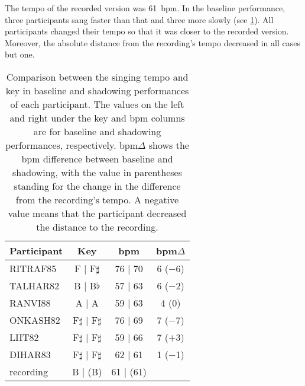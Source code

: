 The tempo of the recorded version was \SI{61}{\ac{bpm}}.
In the baseline performance, three participants sang faster than that and three more slowly (see \cref{tab:bpm_and_keys}).
All participants changed their tempo so that it was closer to the recorded version.
Moreover, the absolute distance from the recording's tempo decreased in all cases but one.


\begin{table}
	\caption[Key and \acs{bpm} deviation summary]
			{Comparison between the singing tempo and key in baseline and shadowing performances of each participant.
			The values on the left and right under the key and \acs{bpm} columns are for baseline and shadowing performances, respectively.
			\acs{bpm}$\Delta$ shows the \acs{bpm} difference between baseline and shadowing, with the value in parentheses standing for the change in the difference from the recording's tempo.
			A negative value means that the participant decreased the distance to the recording.}
	\label{tab:bpm_and_keys}
	\centering
	\begin{tabularx}{\linewidth}{Xccc}
		\toprule
		\bfseries{Participant}	& \bfseries{Key}			& \bfseries{\acs{bpm}}		& \bfseries{\acs{bpm}$\Delta$}	\\
		\midrule
		RITRAF85				& F  |  F$\sharp$			& 76  |  70					&  6 ($-$6)						\\
		TALHAR82				& B  |  B$\flat$			& 57  |  63					&  6 ($-$2)						\\
		RANVI88					& A  |  A					& 59  |  63					&  4 (\phantom{$-$}0)			\\
		ONKASH82				& F$\sharp$  |  F$\sharp$	& 76  |  69					&  7 ($-$7)						\\
		LIIT82					& F$\sharp$  |  F$\sharp$	& 59  |  66					&  7 ($+$3)						\\
		DIHAR83					& F$\sharp$  |  F$\sharp$	& 62  |  61					&  1 ($-$1)						\\
		\rule{0pt}{0.5cm}%
		recording				& B | (B)					& 61 | (61)					&								\\
		\bottomrule
	\end{tabularx}
\end{table}

